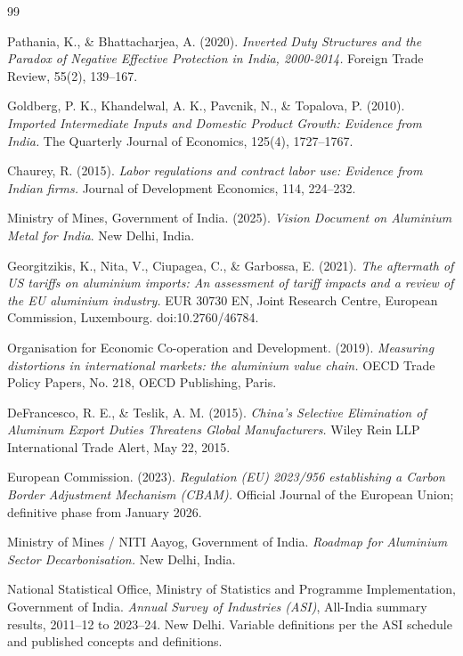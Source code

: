 \documentclass[11pt, a4paper]{article}
\numberwithin{figure}{section}
\numberwithin{table}{section}
\begin{document}
\newpage
\begin{thebibliography}{99}

Pathania, K., \& Bhattacharjea, A. (2020).
\textit{Inverted Duty Structures and the Paradox of Negative Effective Protection in India, 2000-2014.}
Foreign Trade Review, 55(2), 139--167.

Goldberg, P. K., Khandelwal, A. K., Pavcnik, N., \& Topalova, P. (2010).
\textit{Imported Intermediate Inputs and Domestic Product Growth: Evidence from India.}
The Quarterly Journal of Economics, 125(4), 1727--1767.

Chaurey, R. (2015).
\textit{Labor regulations and contract labor use: Evidence from Indian firms.}
Journal of Development Economics, 114, 224--232.

Ministry of Mines, Government of India. (2025).
\textit{Vision Document on Aluminium Metal for India}.
New Delhi, India.

Georgitzikis, K., Nita, V., Ciupagea, C., \& Garbossa, E. (2021).
\textit{The aftermath of US tariffs on aluminium imports: An assessment of tariff impacts and a review of the EU aluminium industry.}
EUR 30730 EN, Joint Research Centre, European Commission, Luxembourg. doi:10.2760/46784.

Organisation for Economic Co-operation and Development. (2019).
\textit{Measuring distortions in international markets: the aluminium value chain.}
OECD Trade Policy Papers, No. 218, OECD Publishing, Paris.

DeFrancesco, R. E., \& Teslik, A. M. (2015).
\textit{China's Selective Elimination of Aluminum Export Duties Threatens Global Manufacturers.}
Wiley Rein LLP International Trade Alert, May 22, 2015.

European Commission. (2023).
\textit{Regulation (EU) 2023/956 establishing a Carbon Border Adjustment Mechanism (CBAM).}
Official Journal of the European Union; definitive phase from January 2026.

Ministry of Mines / NITI Aayog, Government of India.
\textit{Roadmap for Aluminium Sector Decarbonisation.}
New Delhi, India.

National Statistical Office, Ministry of Statistics and Programme Implementation, Government of India.
\textit{Annual Survey of Industries (ASI)}, All-India summary results, 2011--12 to 2023--24.
New Delhi. Variable definitions per the ASI schedule and published concepts and definitions.


\end{thebibliography}
\end{document}
